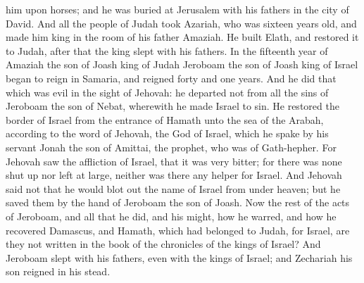 him upon horses; and he was buried at Jerusalem with his fathers in the city of David. And all the people of Judah took Azariah, who was sixteen years old, and made him king in the room of his father Amaziah. He built Elath, and restored it to Judah, after that the king slept with his fathers.  In the fifteenth year of Amaziah the son of Joash king of Judah Jeroboam the son of Joash king of Israel began to reign in Samaria, and reigned forty and one years. And he did that which was evil in the sight of Jehovah: he departed not from all the sins of Jeroboam the son of Nebat, wherewith he made Israel to sin. He restored the border of Israel from the entrance of Hamath unto the sea of the Arabah, according to the word of Jehovah, the God of Israel, which he spake by his servant Jonah the son of Amittai, the prophet, who was of Gath-hepher. For Jehovah saw the affliction of Israel, that it was very bitter; for there was none shut up nor left at large, neither was there any helper for Israel. And Jehovah said not that he would blot out the name of Israel from under heaven; but he saved them by the hand of Jeroboam the son of Joash.  Now the rest of the acts of Jeroboam, and all that he did, and his might, how he warred, and how he recovered Damascus, and Hamath, which had belonged to Judah, for Israel, are they not written in the book of the chronicles of the kings of Israel? And Jeroboam slept with his fathers, even with the kings of Israel; and Zechariah his son reigned in his stead. 

